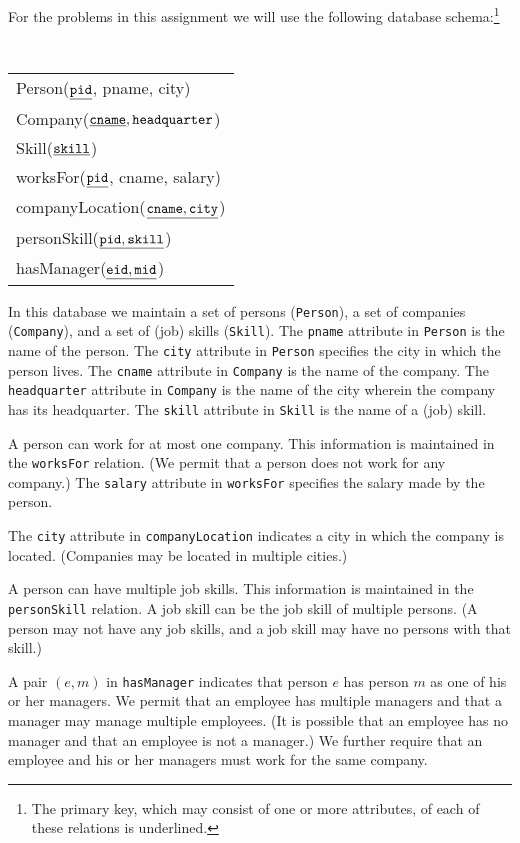 \documentclass{article}
\begin{document}
For the problems in this assignment we will use the following database schema:\footnote{The primary key, which may consist of one or more attributes, of each of these relations is underlined.}

\begin{center}
{\tt
  \begin{tabular}{l}
  {Person}($\underline{\tt pid}$, pname, city) \\
  {Company}($\underline{\tt cname}, {\tt headquarter}$) \\
  {Skill}($\underline{\tt skill}$) \\
  {worksFor}($\underline{\tt pid}$, cname, salary) \\
  {companyLocation}($\underline{\tt cname, city}$) \\
  {personSkill}($\underline{\tt pid, skill}$) \\
  {hasManager}($\underline{\tt eid, mid}$) \\
  \end{tabular}
  }
\end{center}

In this database we maintain a set of persons ({\tt Person}), a set
of companies ({\tt Company}), and a set of (job) skills ({\tt Skill}).  
The {\tt pname} attribute in {\tt Person} is the name of the person.  
The {\tt city} attribute in {\tt Person} specifies the city in which the person lives.  
The {\tt cname} attribute in {\tt Company} is the name of the company.
The {\tt headquarter} attribute in {\tt Company} is the name of the city wherein the company has its headquarter.
The {\tt skill} attribute in {\tt Skill} is the name of a (job) skill.

A person can work for at most one company. This information is maintained in the {\tt worksFor} relation. (We permit that a person does not work for any company.)
The {\tt salary} attribute in {\tt worksFor} specifies the salary made by the person.

The {\tt city} attribute in {\tt companyLocation} indicates a city in which the company is located.
(Companies may be located in multiple cities.)

A person can have multiple job skills. This information is maintained in the {\tt personSkill} relation.  A job skill can be
the job skill of multiple persons.  (A person may not have any job skills, and a job skill may
have no persons with that skill.)

A pair $(e,m)$ in {\tt hasManager} indicates that person $e$ has  
person $m$ as one of his or her managers.
We permit that an employee has multiple managers and that a manager  may manage
multiple employees.  (It is possible that an employee has no manager
and that an employee is not a manager.)
We further require that 
an employee and his or her managers must work for the
same company.
\end{document}
